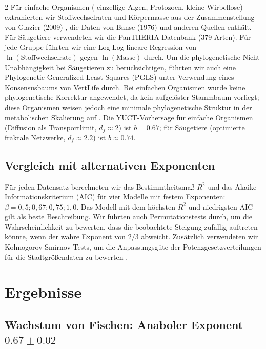 \documentclass[11pt,a4paper]{article}
\newcommand{\df}{d_f}
\begin{document}
\begin{multicols}{2}
		Für einfache Organismen ( einzellige Algen, Protozoen, kleine Wirbellose) extrahierten wir Stoffwechselraten und Körpermasse aus der Zusammenstellung von Glazier (2009) \cite{Glazier2009}, die Daten von Banse (1976) \cite{Banse1976} und anderen Quellen enthält. Für Säugetiere verwendeten wir die PanTHERIA-Datenbank \cite{PanTHERIA} (379 Arten). Für jede Gruppe führten wir eine Log-Log-lineare Regression von \(\ln(\text{Stoffwechselrate})\) gegen \(\ln(\text{Masse})\) durch. Um die phylogenetische Nicht-Unabhängigkeit bei Säugetieren zu berücksichtigen, führten wir auch eine Phylogenetic Generalized Least Squares (PGLS) unter Verwendung eines Konsensusbaums von VertLife \cite{VertLife} durch. Bei einfachen Organismen wurde keine phylogenetische Korrektur angewendet, da kein aufgelöster Stammbaum vorliegt; diese Organismen weisen jedoch eine minimale phylogenetische Struktur in der metabolischen Skalierung auf \cite{Glazier2005}. Die YUCT-Vorhersage für einfache Organismen (Diffusion als Transportlimit, \(\df \approx 2\)) ist \(b = 0.67\); für Säugetiere (optimierte fraktale Netzwerke, \(\df \approx 2.2\)) ist \(b \approx 0.74\).
		
		\subsection{Vergleich mit alternativen Exponenten}
		
		Für jeden Datensatz berechneten wir das Bestimmtheitsmaß \(R^2\) und das Akaike-Informationskriterium (AIC) für vier Modelle mit festem Exponenten: \(\beta = 0,5; 0,67; 0,75; 1,0\). Das Modell mit dem höchsten \(R^2\) und niedrigsten AIC gilt als beste Beschreibung. Wir führten auch Permutationstests durch, um die Wahrscheinlichkeit zu bewerten, dass die beobachtete Steigung zufällig auftreten könnte, wenn der wahre Exponent von \(2/3\) abweicht. Zusätzlich verwendeten wir Kolmogorov-Smirnov-Tests, um die Anpassungsgüte der Potenzgesetzverteilungen für die Stadtgrößendaten zu bewerten \cite{Clauset2009}.
		
		\section{Ergebnisse}
		
		\subsection{Wachstum von Fischen: Anaboler Exponent \(0.67 \pm 0.02\)}
		

\end{multicols}
\end{document}
